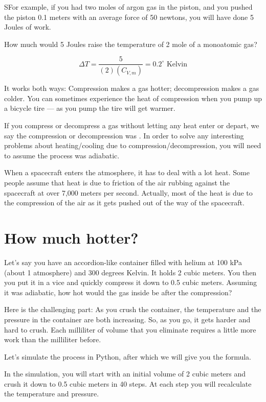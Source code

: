 SFor example,  if you had two moles of argon gas in the piston, and you pushed the piston 0.1 meters with an average force of 50 newtons,  you will have done 5 Joules of work.

How much would 5 Joules raise the temperature of 2 mole of a monoatomic gas?  

$$\Delta T = \frac{5}{(2)(C_{V,m})} = 0.2^\circ \text{ Kelvin}$$ 

It works both ways: Compression makes a gas hotter; decompression makes a gas colder.  You can sometimes experience the heat of compression when you pump up a bicycle tire --- as you pump the tire will get warmer.

If you compress or decompress a gas without letting any heat enter or depart,  we say the compression or decompression was .  In order to solve any interesting problems about heating/cooling due to compression/decompression,  you will need to assume the process was adiabatic.

When a spacecraft enters the atmosphere,  it has to deal with a lot heat.   Some people assume that heat is due to friction of the air rubbing against the 
spacecraft at over 7,000 meters per second.  Actually,  most of the heat is due to the compression of the air as it gets pushed out of the way of the spacecraft.

\section{How much hotter?}

Let's say you have an accordion-like container filled with helium at 100 kPa (about 1 atmosphere) and 300 degrees Kelvin.  It holds 2 cubic meters.  You then you put it in a vice and quickly compress it down to 0.5 cubic meters.  Assuming it was adiabatic,  how hot would the gas inside be after the compression?

Here is the challenging part:  As you crush the container,  the temperature and the pressure in the container are both increasing.  So, as you go,  it gets harder and hard to crush.  Each milliliter of volume that you eliminate requires a little more work than the milliliter before.

Let's simulate the process in Python, after which we will give you the formula.  

In the simulation, you will start with an initial volume of 2 cubic meters and crush it down to 0.5 cubic meters in 40 steps.  At each step you will recalculate the temperature and pressure.


